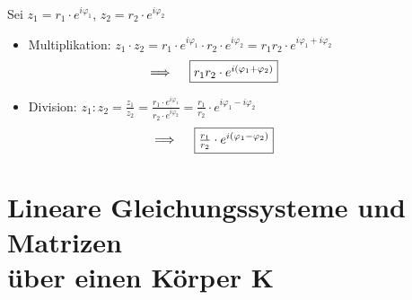 \documentclass{article}
\begin{document}
Sei $z_1 = r_1 \cdot e^{i\varphi_1}$, $z_2 = r_2 \cdot e^{i\varphi_2}$
\begin{itemize}
    \item Multiplikation: $z_1 \cdot z_2 = r_1 \cdot e^{i\varphi_1} \cdot r_2 \cdot e^{i\varphi_2} = r_1r_2 \cdot e^{i\varphi_1 + i\varphi_2}$
    \begin{equation*}
        \hspace{-50px} \implies \hspace{10px} \fcolorbox{black}{white} {$r_1r_2 \cdot e^{i(\varphi_1 + \varphi_2)}$}
    \end{equation*}
    \item Division: $z_1 : z_2 = \frac{z_1}{z_2} = \frac{r_1 \cdot e^{i\varphi_1}}{r_2 \cdot e^{i\varphi_2}} = \frac{r_1}{r_2} \cdot e^{i\varphi_1 - i\varphi_2}$
    \begin{equation*}
        \hspace{-50px} \implies \hspace{10px} \fcolorbox{black}{white} {$\frac{r_1}{r_2} \cdot e^{i(\varphi_1 - \varphi_2)}$}
    \end{equation*}
\end{itemize}

\newpage

\section{\texorpdfstring{Lineare Gleichungssysteme und Matrizen \\über einen Körper K}{Lineare Gleichungssysteme und Matrizen über einen Körper K}}
\end{document}
